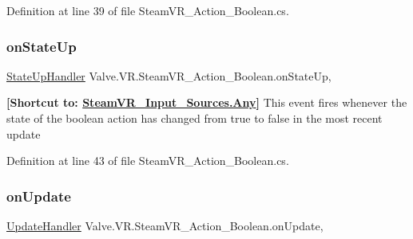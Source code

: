 Definition at line 39 of file Steam\+V\+R\+\_\+\+Action\+\_\+\+Boolean.\+cs.

\mbox{\label{class_valve_1_1_v_r_1_1_steam_v_r___action___boolean_a3516cf7cfb1a60d2e35cb33766f7ee9b}} 
\subsubsection{\texorpdfstring{onStateUp}{onStateUp}}
{\footnotesize\ttfamily \mbox{\hyperlink{class_valve_1_1_v_r_1_1_steam_v_r___action___boolean_a87ebada25dac6016557c3b81e6324b90}{State\+Up\+Handler}} Valve.\+V\+R.\+Steam\+V\+R\+\_\+\+Action\+\_\+\+Boolean.\+on\+State\+Up\hspace{0.3cm}{\ttfamily [add]}, {\ttfamily [remove]}}



{\bfseries{\mbox{[}Shortcut to\+: \mbox{\hyperlink{namespace_valve_1_1_v_r_a82e5bf501cc3aa155444ee3f0662853faed36a1ef76a59ee3f15180e0441188ad}{Steam\+V\+R\+\_\+\+Input\+\_\+\+Sources.\+Any}}\mbox{]}}} This event fires whenever the state of the boolean action has changed from true to false in the most recent update 



Definition at line 43 of file Steam\+V\+R\+\_\+\+Action\+\_\+\+Boolean.\+cs.

\mbox{\label{class_valve_1_1_v_r_1_1_steam_v_r___action___boolean_abacac827162ffe15b71a5ac0f848baee}} 
\subsubsection{\texorpdfstring{onUpdate}{onUpdate}}
{\footnotesize\ttfamily \mbox{\hyperlink{class_valve_1_1_v_r_1_1_steam_v_r___action___boolean_ab9ee21a88a5d5d23603465c55796fcf5}{Update\+Handler}} Valve.\+V\+R.\+Steam\+V\+R\+\_\+\+Action\+\_\+\+Boolean.\+on\+Update\hspace{0.3cm}{\ttfamily [add]}, {\ttfamily [remove]}}



